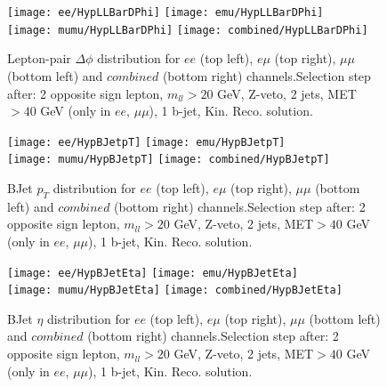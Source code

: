 \clearpage
\newpage

\begin{figure}
  \texttt{[image: ee/HypLLBarDPhi]}
  \texttt{[image: emu/HypLLBarDPhi]}\\
  \texttt{[image: mumu/HypLLBarDPhi]}
  \texttt{[image: combined/HypLLBarDPhi]}
\caption{Lepton-pair $\Delta\phi$ distribution for $ee$ (top left), $e\mu$ (top right), $\mu\mu$ (bottom left) and $combined$ (bottom right) channels.\newline Selection step after: 2 opposite sign lepton, $m_{ll}>20$ GeV, Z-veto, 2 jets, MET$>40$ GeV (only in $ee$, $\mu\mu$), 1 b-jet, Kin. Reco. solution.}
\end{figure}

\clearpage
\newpage


\begin{figure}
  \texttt{[image: ee/HypBJetpT]}
  \texttt{[image: emu/HypBJetpT]}\\
  \texttt{[image: mumu/HypBJetpT]}
  \texttt{[image: combined/HypBJetpT]}
\caption{BJet $p_T$ distribution for $ee$ (top left), $e\mu$ (top right), $\mu\mu$ (bottom left) and $combined$ (bottom right) channels.\newline Selection step after: 2 opposite sign lepton, $m_{ll}>20$ GeV, Z-veto, 2 jets, MET$>40$ GeV (only in $ee$, $\mu\mu$), 1 b-jet, Kin. Reco. solution.}
\end{figure}

\clearpage
\newpage

\begin{figure}
  \texttt{[image: ee/HypBJetEta]}
  \texttt{[image: emu/HypBJetEta]}\\
  \texttt{[image: mumu/HypBJetEta]}
  \texttt{[image: combined/HypBJetEta]}
\caption{BJet $\eta$ distribution for $ee$ (top left), $e\mu$ (top right), $\mu\mu$ (bottom left) and $combined$ (bottom right) channels.\newline Selection step after: 2 opposite sign lepton, $m_{ll}>20$ GeV, Z-veto, 2 jets, MET$>40$ GeV (only in $ee$, $\mu\mu$), 1 b-jet, Kin. Reco. solution.}
\end{figure}


